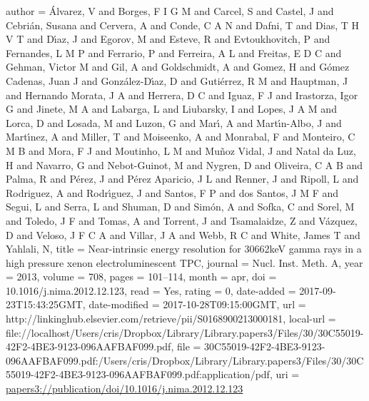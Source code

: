 {{{{{{{{{{{{author = {{\'A}lvarez, V and Borges, F I G M and Carcel, S and Castel, J and Cebri{\'a}n, Susana and Cervera, A and Conde, C A N and Dafni, T and Dias, T H V T and D{\'\i}az, J and Egorov, M and Esteve, R and Evtoukhovitch, P and Fernandes, L M P and Ferrario, P and Ferreira, A L and Freitas, E D C and Gehman, Victor M and Gil, A and Goldschmidt, A and Gomez, H and G{\'o}mez Cadenas, Juan J and Gonz{\'a}lez-D{\'\i}az, D and Guti{\'e}rrez, R M and Hauptman, J and Hernando Morata, J A and Herrera, D C and Iguaz, F J and Irastorza, Igor G and Jinete, M A and Labarga, L and Liubarsky, I and Lopes, J A M and Lorca, D and Losada, M and Luzon, G and Mar{\'\i}, A and Mart{\'\i}n-Albo, J and Mart{\'\i}nez, A and Miller, T and Moiseenko, A and Monrabal, F and Monteiro, C M B and Mora, F J and Moutinho, L M and Mu{\~n}oz Vidal, J and Natal da Luz, H and Navarro, G and Nebot-Guinot, M and Nygren, D and Oliveira, C A B and Palma, R and P{\'e}rez, J and P{\'e}rez Aparicio, J L and Renner, J and Ripoll, L and Rodriguez, A and Rodr{\'\i}guez, J and Santos, F P and dos Santos, J M F and Segui, L and Serra, L and Shuman, D and Sim{\'o}n, A and Sofka, C and Sorel, M and Toledo, J F and Tomas, A and Torrent, J and Tsamalaidze, Z and V{\'a}zquez, D and Veloso, J F C A and Villar, J A and Webb, R C and White, James T and Yahlali, N},
title = {{Near-intrinsic energy resolution for 30{\textendash}662keV gamma rays in a high pressure xenon electroluminescent TPC}},
journal = {Nucl. Inst. Meth. A},
year = {2013},
volume = {708},
pages = {101--114},
month = apr,
doi = {10.1016/j.nima.2012.12.123},
read = {Yes},
rating = {0},
date-added = {2017-09-23T15:43:25GMT},
date-modified = {2017-10-28T09:15:00GMT},
url = {http://linkinghub.elsevier.com/retrieve/pii/S0168900213000181},
local-url = {file://localhost/Users/cris/Dropbox/Library/Library.papers3/Files/30/30C55019-42F2-4BE3-9123-096AAFBAF099.pdf},
file = {{30C55019-42F2-4BE3-9123-096AAFBAF099.pdf:/Users/cris/Dropbox/Library/Library.papers3/Files/30/30C55019-42F2-4BE3-9123-096AAFBAF099.pdf:application/pdf}},
uri = {\url{papers3://publication/doi/10.1016/j.nima.2012.12.123}}
}

}}}}}}}}}}}

